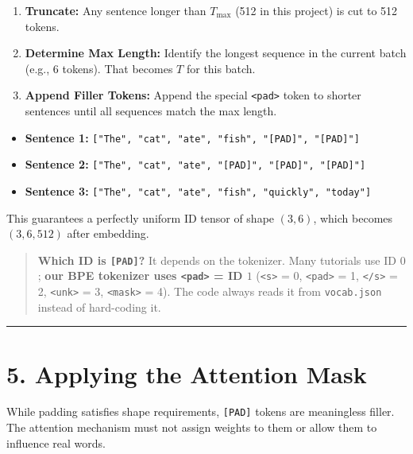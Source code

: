 \documentclass[11pt,a4paper,oneside]{report}
\providecommand{\tightlist}{\setlength{\itemsep}{0pt}\setlength{\parskip}{0pt}}
\begin{document}
\begin{enumerate}
\def\labelenumi{\arabic{enumi}.}
\tightlist
\item
  \textbf{Truncate:} Any sentence longer than \(T_{\max}\) (512 in this project) is cut to 512 tokens.
\item
  \textbf{Determine Max Length:} Identify the longest sequence in the current batch (e.g., 6 tokens). That becomes \(T\) for this batch.
\item
  \textbf{Append Filler Tokens:} Append the special \texttt{\textless{}pad\textgreater{}} token to shorter sentences until all sequences match the max length.
\end{enumerate}

\begin{itemize}
\tightlist
\item
  \textbf{Sentence 1:} \texttt{{[}"The",\ "cat",\ "ate",\ "fish",\ "{[}PAD{]}",\ "{[}PAD{]}"{]}}
\item
  \textbf{Sentence 2:} \texttt{{[}"The",\ "cat",\ "ate",\ "{[}PAD{]}",\ "{[}PAD{]}",\ "{[}PAD{]}"{]}}
\item
  \textbf{Sentence 3:} \texttt{{[}"The",\ "cat",\ "ate",\ "fish",\ "quickly",\ "today"{]}}
\end{itemize}

This guarantees a perfectly uniform ID tensor of shape \((3, 6)\), which becomes \((3, 6, 512)\) after embedding.

\begin{quote}
\textbf{Which ID is \texttt{{[}PAD{]}}?} It depends on the tokenizer. Many tutorials use ID \(0\); \textbf{our BPE tokenizer uses \texttt{\textless{}pad\textgreater{}} = ID \(1\)} (\texttt{\textless{}s\textgreater{}} = 0, \texttt{\textless{}pad\textgreater{}} = 1, \texttt{\textless{}/\allowbreak{}s\textgreater{}} = 2, \texttt{\textless{}unk\textgreater{}} = 3, \texttt{\textless{}mask\textgreater{}} = 4). The code always reads it from \texttt{vocab.\allowbreak{}json} instead of hard-coding it.
\end{quote}

\begin{center}\rule{0.5\linewidth}{0.5pt}\end{center}

\section{5. Applying the Attention Mask}\label{5-applying-the-attention-mask}

While padding satisfies shape requirements, \texttt{{[}PAD{]}} tokens are meaningless filler. The attention mechanism must not assign weights to them or allow them to influence real words.
\end{document}
